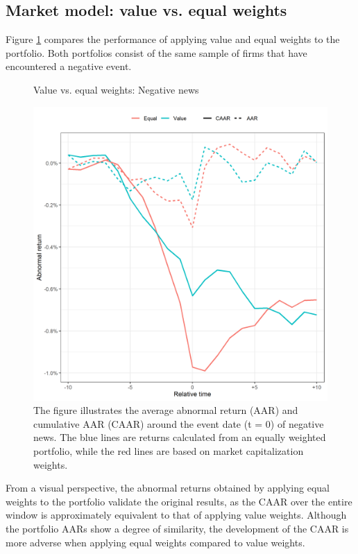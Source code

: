 \subsection{Market model: value vs. equal weights} \label{sec: sens_st_weights}

Figure \ref{fig:ST_neg_sensitivity_weight} compares the performance of applying value and equal weights to the portfolio. Both portfolios consist of the same sample of firms that have encountered a negative event. 

\begin{figure}[H]
    \centering
    \caption{Value vs. equal weights: Negative news }
    \includegraphics[scale=0.6]{Projekt/1.Figures analysis/ST_negative_sensitivity_weight.png}
     \caption*{\footnotesize The figure illustrates the average abnormal return (AAR) and cumulative AAR (CAAR) around the event date (t = 0) of negative news. The blue lines are returns calculated from an equally weighted portfolio, while the red lines are based on market capitalization weights.}
    \label{fig:ST_neg_sensitivity_weight}
\end{figure} 

From a visual perspective, the abnormal returns obtained by applying equal weights to the portfolio validate the original results, as the CAAR over the entire window is approximately equivalent to that of applying value weights. Although the portfolio AARs show a degree of similarity, the development of the CAAR is more adverse when applying equal weights compared to value weights. 

